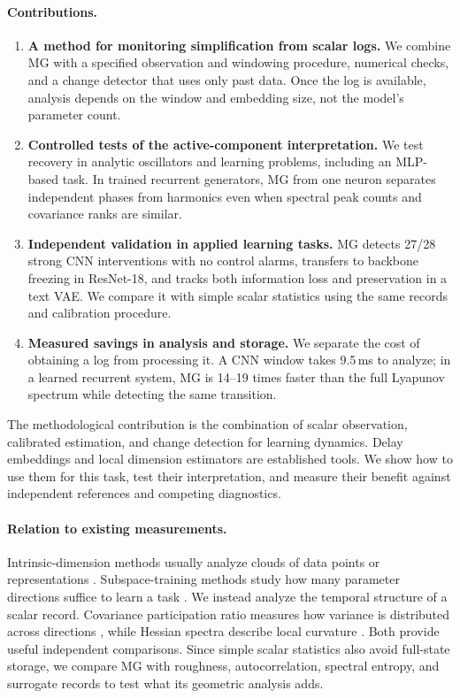 {\paragraph{Contributions.}
\begin{enumerate}[leftmargin=*,itemsep=2pt,topsep=3pt]
\item \textbf{A method for monitoring simplification from scalar logs.} We combine MG with a specified observation and windowing procedure, numerical checks, and a change detector that uses only past data. Once the log is available, analysis depends on the window and embedding size, not the model's parameter count.
\item \textbf{Controlled tests of the active-component interpretation.} We test recovery in analytic oscillators and learning problems, including an MLP-based task. In trained recurrent generators, MG from one neuron separates independent phases from harmonics even when spectral peak counts and covariance ranks are similar.
\item \textbf{Independent validation in applied learning tasks.} MG detects 27/28 strong CNN interventions with no control alarms, transfers to backbone freezing in ResNet-18, and tracks both information loss and preservation in a text VAE. We compare it with simple scalar statistics using the same records and calibration procedure.
\item \textbf{Measured savings in analysis and storage.} We separate the cost of obtaining a log from processing it. A CNN window takes 9.5\,ms to analyze; in a learned recurrent system, MG is 14--19 times faster than the full Lyapunov spectrum while detecting the same transition.
\end{enumerate}

The methodological contribution is the combination of scalar observation, calibrated estimation, and change detection for learning dynamics. Delay embeddings and local dimension estimators are established tools. We show how to use them for this task, test their interpretation, and measure their benefit against independent references and competing diagnostics.

\paragraph{Relation to existing measurements.}
Intrinsic-dimension methods usually analyze clouds of data points or representations \citep{facco2017estimating,ansuini2019intrinsic,pope2021intrinsic}. Subspace-training methods study how many parameter directions suffice to learn a task \citep{li2018measuring,aghajanyan2021intrinsic}. We instead analyze the temporal structure of a scalar record. Covariance participation ratio measures how variance is distributed across directions \citep{gao2017theory}, while Hessian spectra describe local curvature \citep{gurari2018gradient,cohen2021gradient}. Both provide useful independent comparisons. Since simple scalar statistics also avoid full-state storage, we compare MG with roughness, autocorrelation, spectral entropy, and surrogate records \citep{schreiber1996improved} to test what its geometric analysis adds.
}
